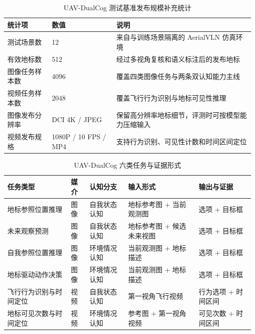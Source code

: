 \begin{thesisappendix}
\begin{table}[htbp]
    \centering
    \caption{UAV-DualCog 测试基准发布规模补充统计}
    \label{tab:app-dataset-scale}
    \small
    \begin{tabularx}{\textwidth}{@{}U{3.0cm}U{3.0cm}X@{}}
        \toprule
        统计项 & 数值 & 说明 \\
        \midrule
        测试场景数 & 12 & 来自与训练场景隔离的 AerialVLN 仿真环境 \\
        有效地标数 & 512 & 经过多视角复核和语义标注后的发布地标 \\
        图像任务样本数 & 4096 & 覆盖四类图像任务与两条双认知能力主线 \\
        视频任务样本数 & 2048 & 覆盖飞行行为识别与地标可见性推理 \\
        图像发布分辨率 & DCI 4K / JPEG & 保留高分辨率地标细节，评测时可按模型能力压缩输入 \\
        视频发布规格 & 1080P / 10 FPS / MP4 & 支持行为识别、可见性计数和时间区间定位 \\
        \bottomrule
    \end{tabularx}
\end{table}

\begin{table}[htbp]
    \centering
    \caption{UAV-DualCog 六类任务与证据形式}
    \label{tab:app-task-matrix}
    \footnotesize
    \setlength{\tabcolsep}{3pt}
    \begin{tabularx}{\textwidth}{@{}U{2.8cm}U{1.4cm}U{2.0cm}U{4.5cm}U{2.4cm}@{}}
        \toprule
        任务类型 & 媒介 & 认知分支 & 输入形式 & 输出与证据 \\
        \midrule
        地标参照位置推理 & 图像 & 自我状态认知 & 地标参考图 + 当前观测图 & 选项 + 目标框 \\
        未来观察预测 & 图像 & 自我状态认知 & 地标参考图 + 候选未来视图 & 选项 + 目标框 \\
        自我参照位置推理 & 图像 & 环境情况认知 & 当前观测图 + 地标描述 & 选项 + 目标框 \\
        地标驱动动作决策 & 图像 & 环境情况认知 & 当前观测图 + 地标描述 & 选项 + 目标框 \\
        飞行行为识别与时间定位 & 视频 & 自我状态认知 & 第一视角飞行视频 & 行为选项 + 时间区间 \\
        地标可见次数与时间定位 & 视频 & 环境情况认知 & 参考图 + 第一视角视频 & 可见次数 + 时间区间 \\
        \bottomrule
    \end{tabularx}
\end{table}


\end{thesisappendix}
